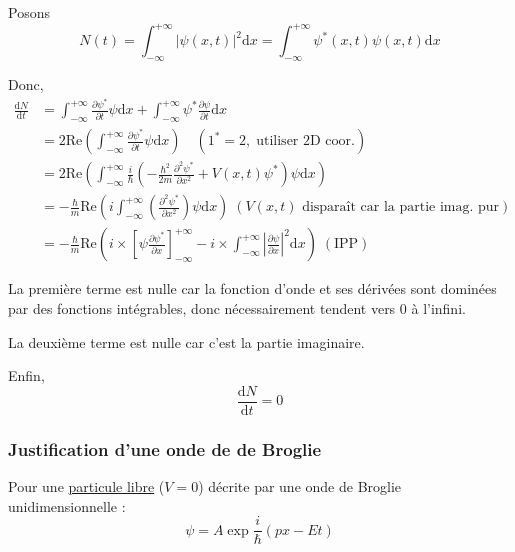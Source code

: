 \begin{myproof}{}{}
  Posons 
  \begin{equation}
    N(t) = \int_{- \infty}^{+ \infty} | \psi(x,t) | ^{2} \mathrm{d} x = \int_{- \infty}^{ + \infty} \psi ^{*}(x,t) \psi(x,t)\mathrm{d}x
  \end{equation}

  Donc, 
  \begin{align}
    \frac{\mathrm{d}N}{\mathrm{d}t} &= \int_{- \infty}^{+ \infty} \frac{\partial \psi ^{*}}{\partial t} \psi \mathrm{d} x + \int_{- \infty}^{+ \infty} \psi ^{*} \frac{\partial \psi}{\partial t} \mathrm{d}x \\ 
                                    &= 2 \mathrm{Re}\left( \int_{- \infty}^{+ \infty} \frac{\partial  \psi ^{*}}{\partial t} \psi \mathrm{d}x \right) \quad (1 ^{*} = 2,\; \text{utiliser 2D coor.})
                                \\ &= 2 \mathrm{Re} \left( \int_{- \infty}^{+ \infty} \frac{
                                        i
                                    }{\hbar} \left( - \frac{\hbar ^{2}}{2m} \frac{\partial ^{2} \psi ^{*}}{\partial x ^{2}} + V(x,t) \psi ^{*} \right) \psi \mathrm{d}x \right) \\ 
                                    &= - \frac{\hbar}{m} \mathrm{Re} \left( i \int_{- \infty}^{+ \infty} \left( \frac{\partial ^{2}\psi ^{*}}{\partial x ^{2}}  \right) \psi \mathrm{d}x \right)\; (V(x,t) \text{ disparaît car la partie imag. pur}) \\ 
                                    &=  - \frac{\hbar}{m} \mathrm{Re} \left( i \times \left[ \psi \frac{\partial \psi ^{*}}{\partial x}  \right]_{- \infty} ^{+ \infty} - i \times \int_{- \infty}^{+ \infty} | \frac{\partial \psi}{\partial x} | ^{2}\mathrm{d}x \right) \;(\text{IPP})
  \end{align}

  La première terme est nulle car la fonction d'onde et ses dérivées sont dominées par des fonctions intégrables, donc nécessairement tendent vers 0 à l'infini.

  La deuxième terme est nulle car c'est la partie imaginaire. 

  Enfin, 
  \begin{equation}
    \frac{\mathrm{d}N}{\mathrm{d}t}  = 0
  \end{equation}
\end{myproof}


\subsubsection{Justification d'une onde de de Broglie} %
\label{sub:Justification d'une onde de de Broglie}
Pour une \underline{particule libre} ($V=0$) décrite par une onde de Broglie unidimensionnelle : 
\begin{equation}
  \psi = A \exp \frac{i}{\hbar}  (p x -Et)
\end{equation}

